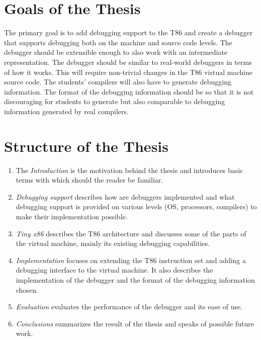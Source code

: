 \section{Goals of the Thesis}
The primary goal is to add debugging support to the T86 and create a debugger
that supports debugging both on the machine and source code levels. The
debugger should be extensible enough to also work with an intermediate
representation. The debugger should be similar to real-world debuggers in terms
of how it works. This will require non-trivial changes in the T86 virtual
machine source code. The students' compilers will also have to generate
debugging information. The format of the debugging information should be so
that it is not discouraging for students to generate but also comparable to
debugging information generated by real compilers.

\section{Structure of the Thesis}
\begin{enumerate}
    \item The \textit{Introduction} is the motivation behind the thesis and
        introduces basic terms with which should the reader be familiar.
    \item \textit{Debugging support} describes how are debuggers implemented
        and what debugging support is provided on various levels (OS,
        processors, compilers) to make their implementation possible.
    \item \textit{Tiny x86} describes the T86 architecture and discusses some
        of the parts of the virtual machine, mainly its existing debugging
        capabilities.
    \item \textit{Implementation} focuses on extending the T86 instruction set
        and adding a debugging interface to the virtual machine. It also
        describes the implementation of the debugger and the format of the
        debugging information chosen.
    \item \textit{Evaluation} evaluates the performance of the debugger and its
        ease of use.
    \item \textit{Conclusions} summarizes the result of the thesis and speaks
        of possible future work.
\end{enumerate}
